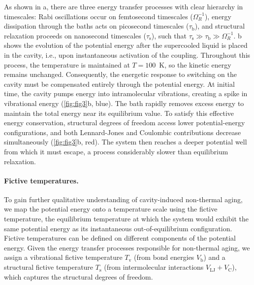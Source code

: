 \documentclass[aps, prl,
 reprint,
 superscriptaddress,
 citeautoscript,
 amsmath,amssymb,
 tightenlines
]{revtex4-2}
\begin{document}
As shown in a, there are three energy transfer processes with clear hierarchy in timescales:
Rabi oscillations occur on femtosecond timescales ($\Omega_R^{-1}$), energy dissipation through the baths acts on picosecond timescales ($\tau_\mathrm{b}$), and structural relaxation proceeds on nanosecond timescales ($\tau_\mathrm{s}$), such that $\tau_\mathrm{s} \gg \tau_\mathrm{b} \gg \Omega_R^{-1}$.
b shows the evolution of the potential energy after the supercooled liquid is placed in the cavity, i.e., upon instantaneous activation of the coupling. Throughout this process, the temperature is maintained at $T=100$~K, so the kinetic energy remains unchanged. 
Consequently, the energetic response to switching on the cavity must be compensated entirely through the potential energy. 
At initial time, the cavity pumps energy into intramolecular vibrations, creating a spike in vibrational energy (\cref{fig:fig3}b, blue). 
The bath rapidly removes excess energy to maintain the total energy near its equilibrium value. 
To satisfy this effective energy conservation, structural degrees of freedom access lower potential-energy configurations, and both Lennard-Jones and Coulombic contributions decrease simultaneously (\cref{fig:fig3}b, red). 
The system then reaches a deeper potential well from which it must escape, a process considerably slower than equilibrium relaxation.


\paragraph*{Fictive temperatures.} To gain further qualitative understanding of cavity-induced non-thermal aging, we map the potential energy onto a temperature scale using the fictive temperature, the equilibrium temperature at which the system would exhibit the same potential energy as its instantaneous out-of-equilibrium configuration.\cite{dyre2018isomorph,dyre2020isomorph} 
Fictive temperatures can be defined on different components of the potential energy. Given the energy transfer processes responsible for non-thermal aging, we assign a vibrational fictive temperature $T_\mathrm{v}$ (from bond energies $V_\mathrm{b}$) and a structural fictive temperature $T_\mathrm{s}$ (from intermolecular interactions $V_\mathrm{LJ}+V_\mathrm{C}$), which captures the structural degrees of freedom.
\end{document}
